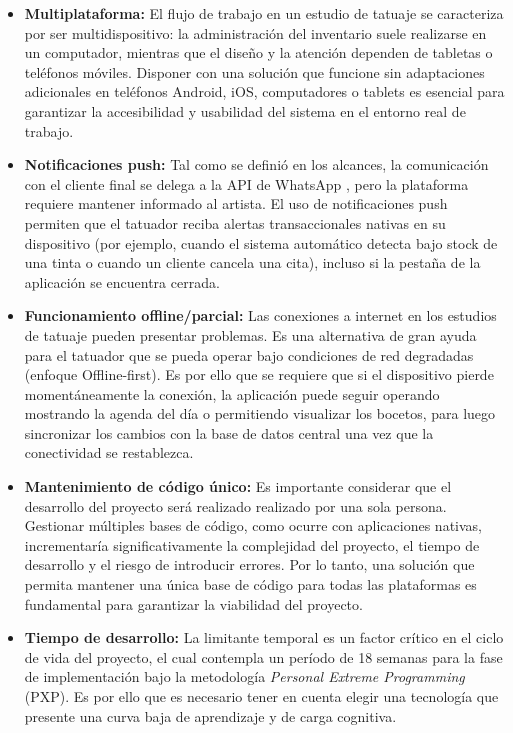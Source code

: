 \begin{itemize}
  \item \textbf{Multiplataforma:} El flujo de trabajo en un estudio de tatuaje se caracteriza por ser multidispositivo: la administración del inventario suele realizarse en un computador, mientras que el diseño y la atención dependen de tabletas o teléfonos móviles. Disponer con una solución que funcione sin adaptaciones adicionales en teléfonos Android, iOS, computadores o tablets es esencial para garantizar la accesibilidad y usabilidad del sistema en el entorno real de trabajo.

  \item \textbf{Notificaciones push:} Tal como se definió en los alcances, la comunicación con el cliente final se delega a la API de WhatsApp \cite{whatsappapi}, pero la plataforma requiere mantener informado al artista. El uso de notificaciones push permiten que el tatuador reciba alertas transaccionales nativas en su dispositivo (por ejemplo, cuando el sistema automático detecta bajo stock de una tinta o cuando un cliente cancela una cita), incluso si la pestaña de la aplicación se encuentra cerrada.

  \item \textbf{Funcionamiento offline/parcial:} Las conexiones a internet en los estudios de tatuaje pueden presentar problemas. Es una alternativa de gran ayuda para el tatuador que se pueda operar bajo condiciones de red degradadas (enfoque Offline-first). Es por ello que se requiere que si el dispositivo pierde momentáneamente la conexión, la aplicación puede seguir operando mostrando la agenda del día o permitiendo visualizar los bocetos, para luego sincronizar los cambios con la base de datos central una vez que la conectividad se restablezca.

  \item \textbf{Mantenimiento de código único:} Es importante considerar que el desarrollo del proyecto será realizado realizado por una sola persona. Gestionar múltiples bases de código, como ocurre con aplicaciones nativas, incrementaría significativamente la complejidad del proyecto, el tiempo de desarrollo y el riesgo de introducir errores. Por lo tanto, una solución que permita mantener una única base de código para todas las plataformas es fundamental para garantizar la viabilidad del proyecto.

  \item \textbf{Tiempo de desarrollo:} La limitante temporal es un factor crítico en el ciclo de vida del proyecto, el cual contempla un período de 18 semanas para la fase de implementación bajo la metodología \textit{Personal Extreme Programming} (PXP). Es por ello que es necesario tener en cuenta elegir una tecnología que presente una curva baja de aprendizaje y de carga cognitiva.
\end{itemize}


